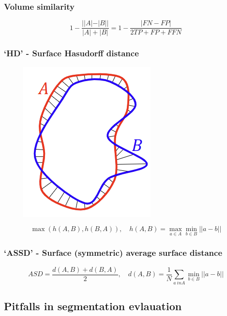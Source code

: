 \documentclass[11pt]{article}
\begin{document}
\subsubsection{Volume similarity}

\begin{definition}
    \begin{equation*}
        1 - \frac{||A| - |B||}{|A| + |B|} = 1 - \frac{|FN - FP|}{2TP + FP +F FN}
    \end{equation*}
\end{definition}

\subsubsection{`HD' - Surface Hasudorff distance}

\begin{figure}[H]
    \centering
    \includegraphics[width=.2\linewidth]{figures/Hausdorff.png}
\end{figure}

\begin{definition}
    \begin{equation*}
        \max(h(A,B),h(B,A)), \quad h(A,B) = \max_{a\in A} \min_{b\in B} ||a-b||
    \end{equation*}
\end{definition}

\subsubsection{`ASSD' - Surface (symmetric) average surface distance}

\begin{definition}
    \begin{equation*}
        ASD = \frac{d(A,B)+d(B,A)}{2}, \quad d(A,B)=\frac 1 N \sum_{a\ in A} \min_{b \in B} ||a - b||
    \end{equation*}
\end{definition}

\subsection{Pitfalls in segmentation evlauation}
\end{document}
